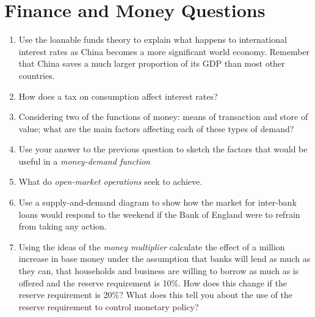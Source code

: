 \documentclass[14pt]{article}
\begin{document}
\section*{Finance and Money Questions}
\begin{enumerate}
\item Use the loanable funds theory to explain what happens to international interest rates as China becomes a more significant world economy.  Remember that China saves a much larger proportion of its GDP than most other countries. 
\item How does a tax on consumption affect interest rates?
\item Considering two of the functions of money: means of transaction and store of value; what are the main factors affecting each of these types of demand? 
\item Use your answer to the previous question to sketch the factors that would be useful in a \emph{money-demand function}
\item What do \emph{open-market operations} seek to achieve. 
\item Use a supply-and-demand diagram to show how the market for inter-bank loans would respond to the weekend if the Bank of England were to refrain from taking any action. 
\item Using the ideas of the \emph{money multiplier} calculate the effect of a  million increase in base money under the assumption that banks will lend as much as they can, that households and business are willing to borrow as much as is offered and the reserve requirement is 10\%.  How does this change if the reserve requirement is 20\%?  What does this tell you about the use of the reserve requirement to control monetary policy? 
\end{enumerate}
\end{document}
